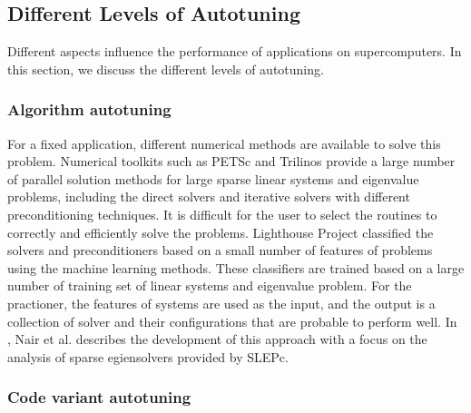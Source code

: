 \subsection{Different Levels  of Autotuning}

Different aspects influence the performance of applications on supercomputers. In this section, we discuss the different levels of autotuning. 

	\subsubsection{Algorithm autotuning}
	
	For a fixed application, different numerical methods are available to solve this problem. Numerical toolkits such as PETSc and Trilinos provide a large number of parallel solution methods for large sparse linear systems and eigenvalue problems, including the direct solvers and iterative solvers with different preconditioning techniques. It is difficult for the user to select the routines to correctly and efficiently solve the problems. Lighthouse Project \cite{norris2014lighthouse} classified the solvers and preconditioners based on a small number of features of problems using the machine learning methods. These classifiers are trained based on a large number of training set of linear systems and eigenvalue problem. For the practioner, the features of systems are used as the input, and the output is a collection of solver and their configurations that are probable to perform well. In \cite{nair2014generating}, Nair et al. describes the development of this approach with a focus on the analysis of sparse egiensolvers provided by SLEPc.
	
	\subsubsection{Code variant autotuning}
	
